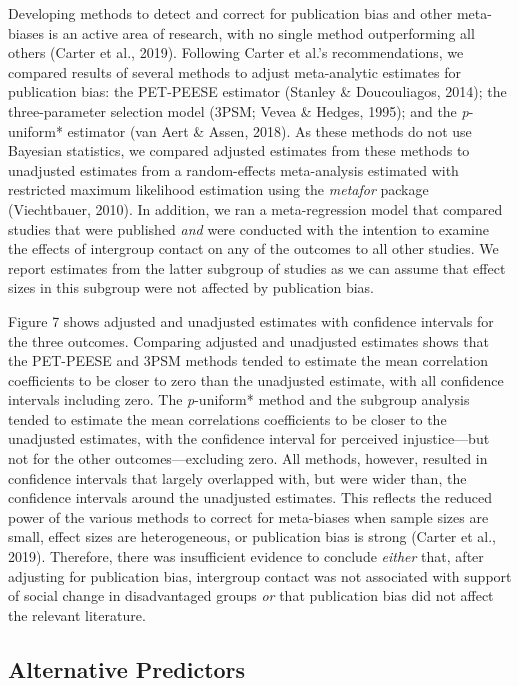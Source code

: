 \documentclass[twocolumn, 11pt, letterpaper]{article}
\begin{document}
Developing methods to detect and correct for publication bias and other
meta-biases is an active area of research, with no single method
outperforming all others (Carter et al., 2019). Following Carter et
al.'s recommendations, we compared results of several methods to adjust
meta-analytic estimates for publication bias: the PET-PEESE estimator
(Stanley \& Doucouliagos, 2014); the three-parameter selection model
(3PSM; Vevea \& Hedges, 1995); and the \emph{p}-uniform* estimator (van
Aert \& Assen, 2018). As these methods do not use Bayesian statistics,
we compared adjusted estimates from these methods to unadjusted
estimates from a random-effects meta-analysis estimated with restricted
maximum likelihood estimation using the \emph{metafor} package
(Viechtbauer, 2010). In addition, we ran a meta-regression model that
compared studies that were published \emph{and} were conducted with the
intention to examine the effects of intergroup contact on any of the
outcomes to all other studies. We report estimates from the latter
subgroup of studies as we can assume that effect sizes in this subgroup
were not affected by publication bias.

Figure 7 shows adjusted and unadjusted estimates with confidence
intervals for the three outcomes. Comparing adjusted and unadjusted
estimates shows that the PET-PEESE and 3PSM methods tended to estimate
the mean correlation coefficients to be closer to zero than the
unadjusted estimate, with all confidence intervals including zero. The
\emph{p}-uniform* method and the subgroup analysis tended to estimate
the mean correlations coefficients to be closer to the unadjusted
estimates, with the confidence interval for perceived injustice---but
not for the other outcomes---excluding zero. All methods, however,
resulted in confidence intervals that largely overlapped with, but were
wider than, the confidence intervals around the unadjusted estimates.
This reflects the reduced power of the various methods to correct for
meta-biases when sample sizes are small, effect sizes are heterogeneous,
or publication bias is strong (Carter et al., 2019). Therefore, there
was insufficient evidence to conclude \emph{either} that, after
adjusting for publication bias, intergroup contact was not associated
with support of social change in disadvantaged groups \emph{or} that
publication bias did not affect the relevant literature.

\hypertarget{alternative-predictors}{%
\subsection{Alternative Predictors}\label{alternative-predictors}}
\end{document}
